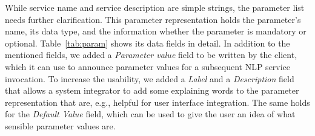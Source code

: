 While service name and service description are simple strings, the
parameter list needs further clarification. This parameter
representation holds the parameter's name, its data type, and the
information whether the parameter is mandatory or
optional. Table~\ref{tab:param} shows its data fields in detail. In
addition to the mentioned fields, we added a \emph{Parameter value}
field to be written by the client, which it can use to announce
parameter values for a subsequent NLP service invocation. To increase
the usability, we added a \emph{Label} and a \emph{Description} field
that allows a system integrator to add some explaining words to the
parameter representation that are, e.g., helpful for user interface
integration.  The same holds for the \emph{Default Value} field, which
can be used to give the user an idea of what sensible parameter values
are.


